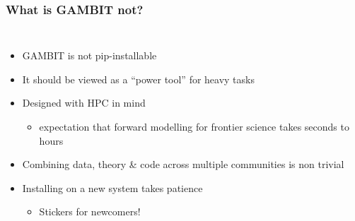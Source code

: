 \documentclass[aspectratio=169]{beamer}
\begin{document}
\begin{frame}
    
\end{frame}

\begin{frame}
    \frametitle{What is GAMBIT not?}
    \begin{columns}
        \begin{itemize}
            \item GAMBIT is not pip-installable
            \item It should be viewed as a ``power tool'' for heavy tasks
            \item Designed with HPC in mind 
                \begin{itemize}
                    \item expectation that forward modelling for frontier science takes seconds to hours
                \end{itemize}
            \item Combining data, theory \& code across multiple communities is non trivial
            \item Installing on a new system takes patience
                \begin{itemize}
                    \item Stickers for newcomers!
                \end{itemize}
        \end{itemize}

\end{columns}
\end{frame}
\end{document}
